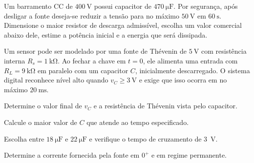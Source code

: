 \begin{questao}[4]{}

Um barramento CC de $\SI{400}{\volt}$ possui capacitor de
$\SI{470}{\micro\farad}$. Por segurança, após desligar a fonte deseja-se reduzir
a tensão para no máximo $\SI{50}{\volt}$ em $\SI{60}{\second}$. Dimensione o
maior resistor de descarga admissível, escolha um valor comercial abaixo dele,
estime a potência inicial e a energia que será dissipada.


\end{questao}

\gabarito[Nível 4]

\blocodesafio
\begin{questao}[4]{}

Um sensor pode ser modelado por uma fonte de Thévenin de $\SI{5}{\volt}$ com
resistência interna $R_s=\SI{1}{\kilo\ohm}$. Ao fechar a chave em $t=0$, ele
alimenta uma entrada com $R_L=\SI{9}{\kilo\ohm}$ em paralelo com um capacitor
$C$, inicialmente descarregado. O sistema digital reconhece nível alto quando
$v_C\ge\SI{3}{\volt}$ e exige que isso ocorra em no máximo
$\SI{20}{\milli\second}$.


\begin{itensq}
\item Determine o valor final de $v_C$ e a resistência de Thévenin vista pelo capacitor.
\item Calcule o maior valor de $C$ que atende ao tempo especificado.
\item Escolha entre $\SI{18}{\micro\farad}$ e $\SI{22}{\micro\farad}$ e verifique o tempo de cruzamento de \SI{3}{\volt}.
\item Determine a corrente fornecida pela fonte em $0^+$ e em regime permanente.
\end{itensq}



\end{questao}
